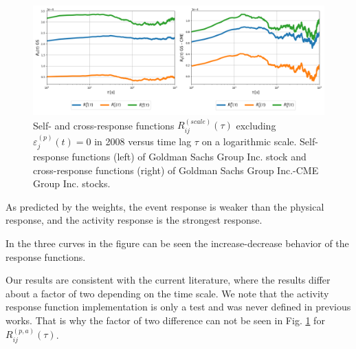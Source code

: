 \begin{figure}[htbp]
    \centering
    \includegraphics[width=\textwidth]
    {figures/03_response_comparison_2008_GSi_CMEj.png}
    \caption{Self- and cross-response functions
             $R^{\left(scale\right)}_{ij}\left(\tau\right)$ excluding
             $\varepsilon^{\left(p\right)}_{j}\left(t\right) = 0$ in 2008
             versus time lag $\tau$ on a logarithmic scale. Self-response
             functions (left) of Goldman Sachs Group Inc. stock and
             cross-response functions (right) of Goldman Sachs Group Inc.-CME
             Group Inc. stocks.}
    \label{fig:relation_responses}
\end{figure}

As predicted by the weights, the event response is weaker than the physical
response, and the activity response is the strongest response.

In the three curves in the figure can be seen the increase-decrease behavior of
the response functions.

Our results are consistent with the current literature, where the results
differ about a factor of two depending on the time scale. We note that the
activity response function implementation is only a test and was never defined
in previous works. That is why the factor of two difference can not be seen in
Fig. \ref{fig:relation_responses} for
$R_{ij}^{\left(p,a\right)} \left( \tau \right)$.
